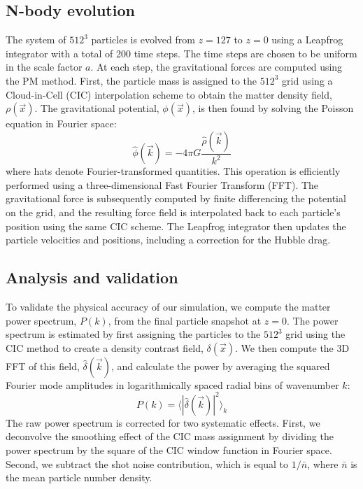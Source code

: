 \documentclass[]{article}
\begin{document}
\subsection{N-body evolution}
The system of $512^3$ particles is evolved from $z=127$ to $z=0$ using a Leapfrog integrator with a total of 200 time steps. The time steps are chosen to be uniform in the scale factor $a$. At each step, the gravitational forces are computed using the PM method. First, the particle mass is assigned to the $512^3$ grid using a Cloud-in-Cell (CIC) interpolation scheme to obtain the matter density field, $\rho(\vec{x})$. The gravitational potential, $\phi(\vec{x})$, is then found by solving the Poisson equation in Fourier space:
\begin{equation}
\hat{\phi}(\vec{k}) = -4 \pi G \frac{\hat{\rho}(\vec{k})}{k^2}
\end{equation}
where hats denote Fourier-transformed quantities. This operation is efficiently performed using a three-dimensional Fast Fourier Transform (FFT). The gravitational force is subsequently computed by finite differencing the potential on the grid, and the resulting force field is interpolated back to each particle's position using the same CIC scheme. The Leapfrog integrator then updates the particle velocities and positions, including a correction for the Hubble drag.

\subsection{Analysis and validation}
To validate the physical accuracy of our simulation, we compute the matter power spectrum, $P(k)$, from the final particle snapshot at $z=0$. The power spectrum is estimated by first assigning the particles to the $512^3$ grid using the CIC method to create a density contrast field, $\delta(\vec{x})$. We then compute the 3D FFT of this field, $\hat{\delta}(\vec{k})$, and calculate the power by averaging the squared Fourier mode amplitudes in logarithmically spaced radial bins of wavenumber $k$:
\begin{equation}
P(k) = \langle |\hat{\delta}(\vec{k})|^2 \rangle_{k}
\end{equation}
The raw power spectrum is corrected for two systematic effects. First, we deconvolve the smoothing effect of the CIC mass assignment by dividing the power spectrum by the square of the CIC window function in Fourier space. Second, we subtract the shot noise contribution, which is equal to $1/\bar{n}$, where $\bar{n}$ is the mean particle number density.
\end{document}

